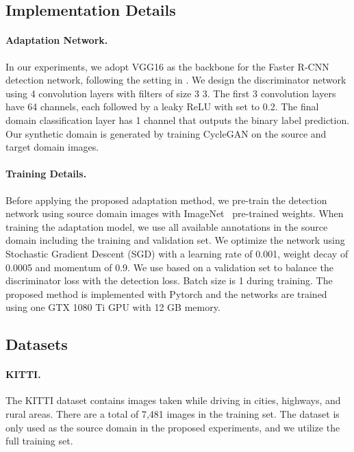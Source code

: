 \documentclass[10pt,twocolumn,letterpaper]{article}
\begin{document}
\subsection{Implementation Details}
\paragraph{Adaptation Network.} 
In our experiments, we adopt VGG16 \cite{Simonyan14c} as the backbone for the Faster R-CNN \cite{Ren_2017} detection network, following the setting in \cite{chen2018domain}.
We design the discriminator network  using 4 convolution layers with filters of size 3  3. 
The first 3 convolution layers have 64 channels, each followed by a leaky ReLU \cite{maas2013rectifier} with  set to 0.2.
The final domain classification layer has 1 channel that outputs the binary label prediction.
Our synthetic domain is generated by training CycleGAN \cite{CycleGAN2017} on the source and target domain images.

\vspace{-4mm}\paragraph{Training Details.} 
Before applying the proposed adaptation method, we pre-train the detection network using source domain images with ImageNet~\cite{deng2009imagenet} pre-trained weights.
When training the adaptation model, we use all available annotations in the source domain including the training and validation set.
We optimize the network using Stochastic Gradient Descent (SGD) with a learning rate of 0.001, weight decay of 0.0005 and momentum of 0.9. We use  based on a validation set to balance the discriminator loss with the detection loss. Batch size is 1 during training.
The proposed method is implemented with Pytorch and the networks are trained using one GTX 1080 Ti GPU with 12 GB memory.



\subsection{Datasets}
\paragraph{KITTI.} 
The KITTI dataset \cite{Geiger2012CVPR} contains images taken while driving in cities, highways, and rural areas.
There are a total of 7,481 images in the training set.
The dataset is only used as the source domain in the proposed experiments, and we utilize the full training set.
\end{document}

